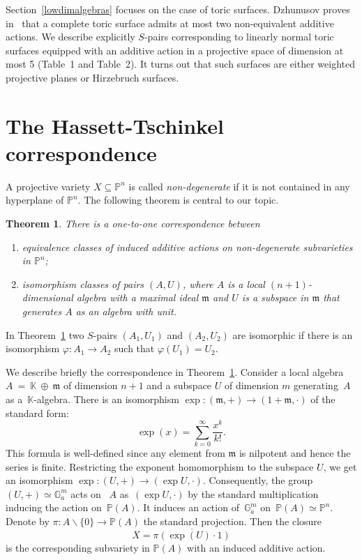 \documentclass[a4paper,draft,reqno,12pt]{amsart}
\newtheorem{theorem}{Theorem}
\theoremstyle{definition}
\theoremstyle{definition}
\theoremstyle{remark}
\def\BG{{\mathbb G}}
\def\BK{{\mathbb K}}
\def\BG{{\mathbb G}}
\def\BK{{\mathbb K}}
\def\BP{{\mathbb P}}
\def\mf{\mathfrak{m}}
\begin{document}
Section~\ref{lowdimalgebras} focuses on the case of toric surfaces. Dzhunusov proves in~\cite{DZ} that a complete toric surface admits at most two non-equivalent additive actions. We describe explicitly $S$-pairs corresponding to linearly normal toric surfaces equipped with an additive action in a projective space of dimension at most 5 (Table~1 and Table~2). It turns out that such surfaces are either weighted projective planes or Hirzebruch surfaces.

\section{The Hassett-Tschinkel correspondence}

A projective variety $X \subseteq \BP^n$ is called \emph{non-degenerate} if it is not contained in any hyperplane of $\BP^n$. The following theorem is central to our topic.
\begin{theorem}\cite[Theorem 2.6]{AZ}\label{correspondence}
There is a one-to-one correspondence between
\begin{enumerate}
    \item equivalence classes of induced additive actions on non-degenerate subvarieties in $\BP^n$; 
    \item isomorphism classes of pairs $(A, U)$, where $A$ is a local $(n+1)$-dimensional algebra with a maximal ideal $\mathfrak{m}$ and $U$ is a subspace in $\mathfrak{m}$ that generates $A$ as an algebra with unit. 
\end{enumerate}
\end{theorem}

In Theorem~\ref{correspondence} two $S$-pairs $(A_1, U_1)$ and $(A_2, U_2)$ are isomorphic if there is an isomorphism $\varphi:A_1\to A_2$ such that $\varphi(U_1)=U_2$.

We describe briefly the correspondence in Theorem~\ref{correspondence}. Consider a local algebra~$A~=~\BK~\oplus~\mf$ of dimension $n+1$ and a subspace $U$ of dimension $m$ generating~$A$ as a~$\BK$-algebra. There is an isomorphism $\exp:(\mf, +) \to (1 +\mf, \cdot)$ of the standard form: \begin{equation*}
    \exp(x) = \sum_{k=0}^\infty\frac{x^k}{k!}.
\end{equation*} This formula is well-defined since any element from $\mf$ is nilpotent and hence the series is finite. Restricting the exponent homomorphism to the subspace $U$, we get an isomorphism $\exp: (U, +) \to (\exp U, \cdot)$. Consequently, the group~$(U,+)\simeq\BG_a^m$ acts on ~$A$ as~$(\exp U,\cdot)$ by the standard multiplication inducing the action on~$\BP(A)$. It induces an action of~$\BG_a^m$ on~$\BP(A)\simeq\BP^n$. Denote by $\pi:A\backslash\{0\}\to\BP(A)$ the standard projection. Then the closure \begin{equation*}
    X = \overline{\pi(\exp(U)\cdot1)}
\end{equation*} is the corresponding subvariety in $\BP(A)$ with an induced additive action.
\end{document}
